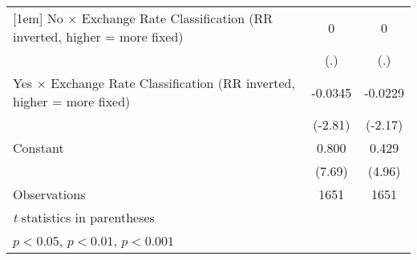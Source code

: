{\begin{tabular}{l*{2}{c}}
[1em]
No $\times$ Exchange Rate Classification (RR inverted, higher = more fixed)&        0         &        0         \\
                &      (.)         &      (.)         \\
[1em]
Yes $\times$ Exchange Rate Classification (RR inverted, higher = more fixed)&  -0.0345\sym{**} &  -0.0229\sym{*}  \\
                &  (-2.81)         &  (-2.17)         \\
[1em]
Constant        &    0.800\sym{***}&    0.429\sym{***}\\
                &   (7.69)         &   (4.96)         \\
\hline
Observations    &     1651         &     1651         \\
\hline\hline
\multicolumn{3}{l}{\footnotesize \textit{t} statistics in parentheses}\\
\multicolumn{3}{l}{\footnotesize \sym{*} \(p<0.05\), \sym{**} \(p<0.01\), \sym{***} \(p<0.001\)}\\
\end{tabular}
}
